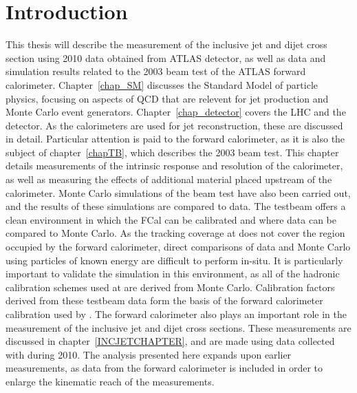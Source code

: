 \chapter{Introduction}

This thesis will describe the measurement of the inclusive jet and dijet cross section using 2010 data obtained from ATLAS detector, as well as data and simulation results related to the 2003 beam test of the ATLAS forward calorimeter.
Chapter~\ref{chap_SM} discusses the Standard Model of particle physics, focusing on aspects of QCD that are relevent for jet production and Monte Carlo event generators. Chapter~\ref{chap_detector} covers the LHC and the \atlas detector. As the calorimeters are used for jet reconstruction, these are discussed in detail. Particular attention is paid to the forward calorimeter, as it is also the subject of chapter~\ref{chapTB}, which describes the 2003 beam test. This chapter details measurements of the intrinsic response and resolution of the calorimeter, as well as measuring the effects of additional material placed upstream of the calorimeter. Monte Carlo simulations of the beam test have also been carried out, and the results of these simulations are compared to data. The testbeam offers a clean environment in which the FCal can be calibrated and where data can be compared to Monte Carlo. As the tracking coverage at \atlas does not cover the region occupied by the forward calorimeter, direct comparisons of data and Monte Carlo using particles of known energy are difficult to perform in-situ. It is particularly important to validate the simulation in this environment, as all of the hadronic calibration schemes used at \atlas are derived from Monte Carlo. Calibration factors derived from these testbeam data form the basis of the forward calorimeter calibration used by \atlas. The forward calorimeter also plays an important role in the measurement of the inclusive jet and dijet cross sections. These measurements are discussed in chapter~\ref{INCJETCHAPTER}, and are made using data collected with \atlas during 2010. The analysis presented here expands upon earlier measurements, as data from the forward calorimeter is included in order to enlarge the kinematic reach of the measurements. 




